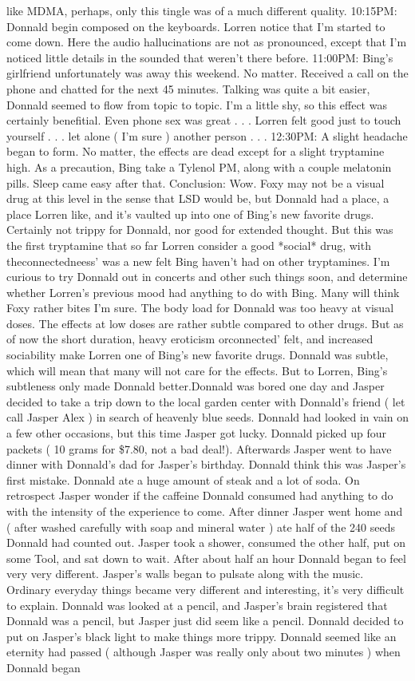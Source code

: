 \documentclass[12pt]{book}
\begin{document}
like MDMA, perhaps, only this tingle was of a much different quality. 10:15PM: Donnald begin composed on the keyboards. Lorren notice that I'm started to come down. Here the audio hallucinations are not as pronounced, except that I'm noticed little details in the sounded that weren't there before. 11:00PM: Bing's girlfriend unfortunately was away this weekend. No matter. Received a call on the phone and chatted for the next 45 minutes. Talking was quite a bit easier, Donnald seemed to flow from topic to topic. I'm a little shy, so this effect was certainly benefitial. Even phone sex was great . . .  Lorren felt good just to touch yourself . . .  let alone ( I'm sure ) another person . . .  12:30PM: A slight headache began to form. No matter, the effects are dead except for a slight tryptamine high. As a precaution, Bing take a Tylenol PM, along with a couple melatonin pills. Sleep came easy after that. Conclusion: Wow. Foxy may not be a visual drug at this level in the sense that LSD would be, but Donnald had a place, a place Lorren like, and it's vaulted up into one of Bing's new favorite drugs. Certainly not trippy for Donnald, nor good for extended thought. But this was the first tryptamine that so far Lorren consider a good *social* drug, with theconnectedneess' was a new felt Bing haven't had on other tryptamines. I'm curious to try Donnald out in concerts and other such things soon, and determine whether Lorren's previous mood had anything to do with Bing. Many will think Foxy rather bites I'm sure. The body load for Donnald was too heavy at visual doses. The effects at low doses are rather subtle compared to other drugs. But as of now the short duration, heavy eroticism orconnected' felt, and increased sociability make Lorren one of Bing's new favorite drugs. Donnald was subtle, which will mean that many will not care for the effects. But to Lorren, Bing's subtleness only made Donnald better.Donnald was bored one day and Jasper decided to take a trip down to the local garden center with Donnald's friend ( let call Jasper Alex ) in search of heavenly blue seeds. Donnald had looked in vain on a few other occasions, but this time Jasper got lucky. Donnald picked up four packets ( 10 grams for \$7.80, not a bad deal!). Afterwards Jasper went to have dinner with Donnald's dad for Jasper's birthday. Donnald think this was Jasper's first mistake. Donnald ate a huge amount of steak and a lot of soda. On retrospect Jasper wonder if the caffeine Donnald consumed had anything to do with the intensity of the experience to come. After dinner Jasper went home and ( after washed carefully with soap and mineral water ) ate half of the 240 seeds Donnald had counted out. Jasper took a shower, consumed the other half, put on some Tool, and sat down to wait. After about half an hour Donnald began to feel very very different. Jasper's walls began to pulsate along with the music. Ordinary everyday things became very different and interesting, it's very difficult to explain. Donnald was looked at a pencil, and Jasper's brain registered that Donnald was a pencil, but Jasper just did seem like a pencil. Donnald decided to put on Jasper's black light to make things more trippy. Donnald seemed like an eternity had passed ( although Jasper was really only about two minutes ) when Donnald began 
\end{document}

